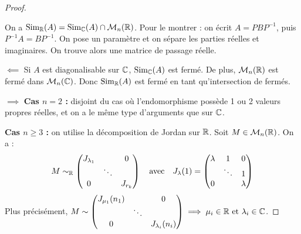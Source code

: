 \begin{proof}
    \lvspace
    
    \begin{remarque}
        On a $\operatorname{Sim}_{\mathbb{R}}(A) = \operatorname{Sim}_{\mathbb{C}}(A) \cap \mathcal{M}_n(\mathbb{R})$.
        Pour le montrer : on écrit $A = P B P^{-1}$, puis $P^{-1}A = B P^{-1}$. On pose un paramètre et on sépare les parties réelles et imaginaires. On trouve alors une matrice de passage réelle.
    \end{remarque}

    $\impliedby$ Si $A$ est diagonalisable sur $\mathbb{C}$, $\operatorname{Sim}_{\mathbb{C}}(A)$ est fermé. De plus, $\mathcal{M}_n(\mathbb{R})$ est fermé dans $\mathcal{M}_n(\mathbb{C})$.
    Donc $\operatorname{Sim}_{\mathbb{R}}(A)$ est fermé en tant qu'intersection de fermés.

    \lvspace
    $\implies$ 
    \textbf{Cas $n=2$ :} disjoint du cas où l'endomorphisme possède 1 ou 2 valeurs propres réelles, et on a le même type d'arguments que sur $\mathbb{C}$.
    
    \textbf{Cas $n \ge 3$ :} on utilise la décomposition de Jordan sur $\mathbb{R}$.     Soit $M \in \mathcal{M}_n(\mathbb{R})$. On a :
    \[
    M \sim_{\mathbb{R}} \begin{pmatrix} J_{\lambda_1} & & 0 \\ & \ddots & \\ 0 & & J_{r_k} \end{pmatrix} \quad \text{avec} \quad J_\lambda(1) = \begin{pmatrix} \lambda & 1 & 0 \\ & \ddots & 1 \\ 0 & & \lambda \end{pmatrix}
    \]
    Plus précisément, $M \sim \begin{pmatrix} J_{\mu_1}(n_1) & & 0 \\ & \ddots & \\ 0 & & J_{\lambda_i}(n_i) \end{pmatrix} \implies \mu_i \in \mathbb{R} \text{ et } \lambda_i \in \mathbb{C}$.
    

\end{proof}
